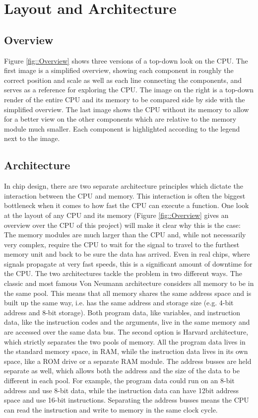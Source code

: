 \section{Layout and Architecture}
\subsection{Overview}
Figure \ref{fig::Overview} shows three versions of a top-down look on the CPU. The first image is a simplified overview, showing each component in roughly the correct position and scale as well as each line connecting the components, and serves as a reference for exploring the CPU. The image on the right is a top-down render of the entire CPU and its memory to be compared side by side with the simplified overview. The last image shows the CPU without its memory to allow for a better view on the other components which are relative to the memory module much smaller. Each component is highlighted according to the legend next to the image.

\subsection{Architecture} \label{ssec::Architecture}
In chip design, there are two separate architecture principles which dictate the interaction between the CPU and memory. This interaction is often the biggest bottleneck when it comes to how fast the CPU can execute a function. One look at the layout of any CPU and its memory (Figure \ref{fig::Overview} gives an overview over the CPU of this project) will make it clear why this is the case: The memory modules are much larger than the CPU and, while not necessarily very complex, require the CPU to wait for the signal to travel to the furthest memory unit and back to be sure the data has arrived. Even in real chips, where signals propagate at very fast speeds, this is a significant amount of downtime for the CPU. The two architectures tackle the problem in two different ways. The classic and most famous Von Neumann architecture considers all memory to be in the same pool. This means that all memory shares the same address space and is built up the same way, i.e. has the same address and storage size (e.g. 4-bit address and 8-bit storage). Both program data, like variables, and instruction data, like the instruction codes and the arguments, live in the same memory and are accessed over the same data bus. The second option is Harvard architecture, which strictly separates the two pools of memory. All the program data lives in the standard memory space, in RAM, while the instruction data lives in its own space, like a ROM drive or a separate RAM module. The address busses are held separate as well, which allows both the address and the size of the data to be different in each pool. For example, the program data could run on an 8-bit address and use 8-bit data, while the instruction data can have 12bit address space and use 16-bit instructions. Separating the address busses means the CPU can read the instruction and write to memory in the same clock cycle.

